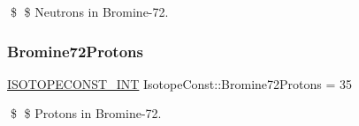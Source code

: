 \$ \$ Neutrons in Bromine-\/72. \mbox{\label{group___isotope_const-_bromine-_br72_ga6852269144d02469f66b3c8383e50578}} 
\subsubsection{\texorpdfstring{Bromine72\+Protons}{Bromine72Protons}}
{\footnotesize\ttfamily \mbox{\hyperlink{group___isotope_const-_macros_ga5f18360b3e99483a35c32d789e62621c}{I\+S\+O\+T\+O\+P\+E\+C\+O\+N\+S\+T\+\_\+\+I\+NT}} Isotope\+Const\+::\+Bromine72\+Protons = 35}

\$ \$ Protons in Bromine-\/72. 